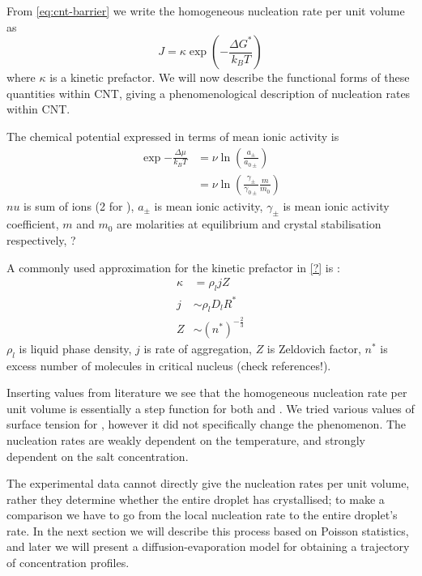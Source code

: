 \documentclass[11pt,twoside]{report}
\begin{document}
From \eqref{eq:cnt-barrier} we write the homogeneous nucleation rate per unit volume as
\begin{equation}
  J = \kappa \exp{\left(-\frac{\Delta G^{*}}{k_B T}\right)}
\end{equation}
where $\kappa$ is a kinetic prefactor.
We will now describe the functional forms of these quantities within CNT, giving a phenomenological description of nucleation rates within CNT.

The chemical potential expressed in terms of mean ionic activity is
\begin{equation}
  \begin{aligned}
  \exp{-\frac{\Delta \mu}{k_B T}} &=
  \nu \ln{\left( \frac{a_\pm}{a_{0\pm}} \right)} \\
  &=
  \nu \ln{\left( \frac{\gamma_\pm}{\gamma_{0\pm}} \frac{m}{m_0} \right)}
  \end{aligned}
\end{equation}
$nu$ is sum of ions (2 for ), $a_\pm$ is mean ionic activity, $\gamma_\pm$ is mean ionic activity coefficient, $m$ and $m_0$ are molarities at equilibrium and crystal stabilisation respectively, ?%

A commonly used approximation for the kinetic prefactor in \eqref{?} is \cite{Sears?}:
\begin{align}
  \kappa &= \rho_l j Z \\
  j &\sim \rho_l D_l R^* \\
  Z &\sim (n^*)^{-\tfrac{2}{3}}
\end{align}
$\rho_l$ is liquid phase density, $j$ is rate of aggregation, $Z$ is Zeldovich factor, $n^*$ is excess number of molecules in critical nucleus (check references!).

Inserting values from literature we see that the homogeneous nucleation rate per unit volume is essentially a step function for both  and .
We tried various values of surface tension for , however it did not specifically change the phenomenon.
The nucleation rates are weakly dependent on the temperature, and strongly dependent on the salt concentration.

The experimental data cannot directly give the nucleation rates per unit volume, rather they determine whether the entire droplet has crystallised; to make a comparison we have to go from the local nucleation rate to the entire droplet's rate.
In the next section we will describe this process based on Poisson statistics, and later we will present a diffusion-evaporation model for obtaining a trajectory of concentration profiles.
\end{document}
